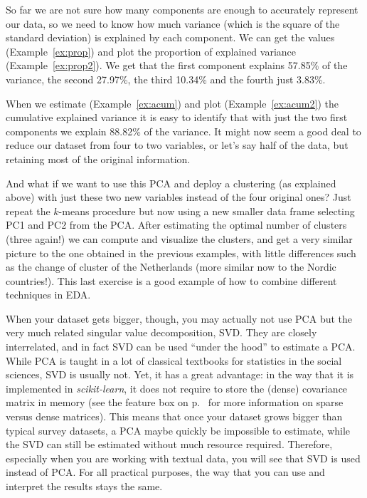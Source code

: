 
So far we are not sure  how many components are enough to accurately represent our data, so we need to know how much variance (which is the square of the standard deviation) is explained by each component. We can get the values (Example~\ref{ex:prop}) and plot  the proportion of explained variance (Example~\ref{ex:prop2}). We get that the first component explains 57.85\% of the variance, the second 27.97\%, the third 10.34\% and the fourth just 3.83\%.


When we estimate (Example~\ref{ex:acum}) and plot (Example~\ref{ex:acum2}) the cumulative explained variance it is easy to identify that with just the two first components we explain 88.82\% of the variance. It might now seem a good deal to reduce our dataset from four to two variables, or let’s say half of the data, but retaining most of the original information.


And what if we want to use this PCA and deploy a clustering (as explained above) with just these two new variables instead of the four original ones?  Just repeat the $k$-means procedure but now using a new smaller data frame selecting PC1 and PC2 from the PCA. After estimating the optimal number of clusters (three again!) we can compute and visualize the clusters, and get a very similar picture to the one obtained in the previous examples, with little differences such as the change of cluster of the Netherlands (more similar now to the Nordic countries!). This last exercise is a good example of how to combine different techniques in EDA.


When your dataset gets bigger, though, you may actually not use PCA
but the very much related singular value decomposition, SVD. They are
closely interrelated, and in fact SVD can be used ``under the hood''
to estimate a PCA. While PCA is taught in a lot of classical textbooks
for statistics in the social sciences, SVD is usually not. Yet, it has
a great advantage: in the way that it is implemented in
\emph{scikit-learn}, it does not require to store the (dense)
covariance matrix in memory (see the feature box on
p.~\pageref{feature:sparse} for more information on sparse versus dense
matrices). This means that once  your dataset grows bigger than
typical survey datasets, a PCA maybe quickly be impossible to estimate,
while the SVD can still be estimated without much resource
required. Therefore, especially when you are working with textual data,
you will see that SVD is used instead of PCA. For all practical
purposes, the way that  you can use and interpret the results stays the
same.

